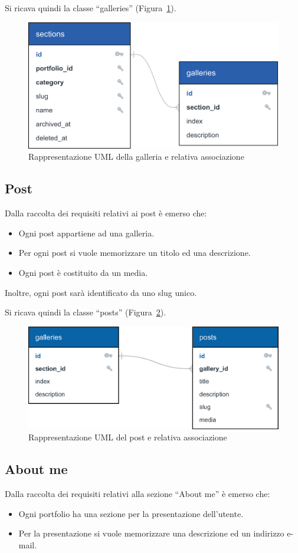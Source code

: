 Si ricava quindi la classe ``galleries'' (Figura~\ref{fig:galleries_db}).

\begin{figure}[htbp]
	\centering
	\includegraphics[width=0.76\linewidth]{figure/galleries_db}
	\caption{Rappresentazione UML della galleria e relativa associazione}
	\label{fig:galleries_db}
\end{figure}

\subsection{Post}
Dalla raccolta dei requisiti relativi ai post \`e emerso che:
\begin{itemize}
	\item Ogni post appartiene ad una galleria.
	\item Per ogni post si vuole memorizzare un titolo ed una descrizione.
	\item Ogni post \`e costituito da un media.
\end{itemize}

Inoltre, ogni post sar\`a identificato da uno slug unico.

Si ricava quindi la classe ``posts'' (Figura~\ref{fig:posts_db}).
\begin{figure}[htbp]
	\centering
	\includegraphics[width=0.76\linewidth]{figure/posts_db}
	\caption{Rappresentazione UML del post e relativa associazione}
	\label{fig:posts_db}
\end{figure}

\subsection{About me}
Dalla raccolta dei requisiti relativi alla sezione ``About me'' \`e emerso che:
\begin{itemize}
	\item Ogni portfolio ha una sezione per la presentazione dell'utente.
	\item Per la presentazione si vuole memorizzare una descrizione ed un indirizzo e-mail.
\end{itemize}

